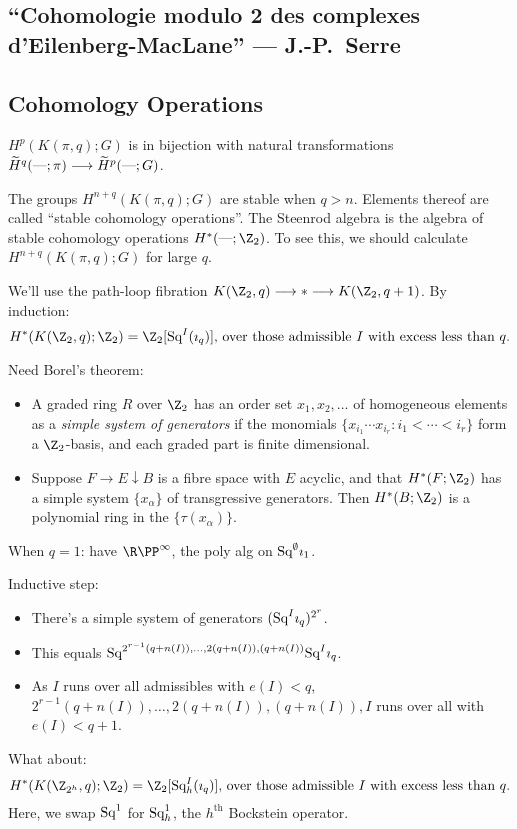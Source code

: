 \documentclass[11pt]{article}
\newcommand{\KanSemResponse}[1]
{
\thispagestyle{fancy}
\section{#1}
}
\begin{document}
\begin{SerreCohModTwoEilMacLane}
\KanSemResponse
{``Cohomologie modulo 2 des complexes d'Eilenberg-MacLane'' --- J.-P.\ Serre}
\subsection*{Cohomology Operations}
\begin{itemise}
\item $H^p(K(\pi,q);G)$ is in bijection with natural transformations $\widetilde H^{q}(\textup{---};\pi)\longrightarrow\widetilde H^{p}(\textup{---};G)$.
\item The groups $H^{n+q}(K(\pi,q);G)$ are stable when $q>n$. Elements thereof are called ``stable cohomology operations''. The Steenrod algebra is the algebra of stable cohomology operations $H^*(\DASH;\Z_2)$. To see this, we should calculate $H^{n+q}(K(\pi,q);G)$ for large $q$.
\item We'll use the path-loop fibration $K(\Z_2,q)\to *\to K(\Z_2,q+1)$. By induction:
\[\text{$H^*(K(\Z_2,q);\Z_2)=\Z_2[\Squ^I(\imath_q)]$, over those admissible $I$ with excess less than $q$.}\]
\item Need Borel's theorem:
\begin{itemize}\squishlist
\item A graded ring $R$ over $\Z_2$ has an order set $x_1,x_2,\ldots$ of homogeneous elements as a \emph{simple system of generators} if the monomials $\{x_{i_1}\cdots x_{i_r}:i_1<\cdots<i_r\}$ form a $\Z_2$-basis, and each graded part is finite dimensional.
\item
Suppose $F\rightarrow E\downarrow B$ is a fibre space with $E$ acyclic, and that $H^*(F;\Z_2)$ has a simple system $\{x_\alpha\}$ of transgressive generators. Then $H^*(B;\Z_2)$ is a polynomial ring in the $\{\tau(x_\alpha)\}$.
\end{itemize}
\item When $q=1$: have $\RP^\infty$, the poly alg on $\textup{Sq}^\emptyset\imath_1$.
\item Inductive step:
\begin{itemize}\squishlist
\item There's a simple system of generators $(\textup{Sq}^I\imath_q)^{2^r}$.
\item This equals $\textup{Sq}^{2^{r-1}(q+n(I)),\ldots,2(q+n(I)),(q+n(I))}\textup{Sq}^I\imath_q$.
\item As $I$ runs over all admissibles with $e(I)<q$, ${2^{r-1}(q+n(I)),\ldots,2(q+n(I)),(q+n(I))},I$ runs over all with $e(I)<q+1$.
\end{itemize}
\item What about:
\[\text{$H^*(K(\Z_{2^h},q);\Z_2)=\Z_2[\Squ^I_h(\imath_q)]$, over those admissible $I$ with excess less than $q$.}\]
Here, we swap $\textup{Sq}^1$ for $\textup{Sq}^1_h$, the $h^\text{th}$ Bockstein operator.


\end{itemise}
\end{SerreCohModTwoEilMacLane}
\end{document}
